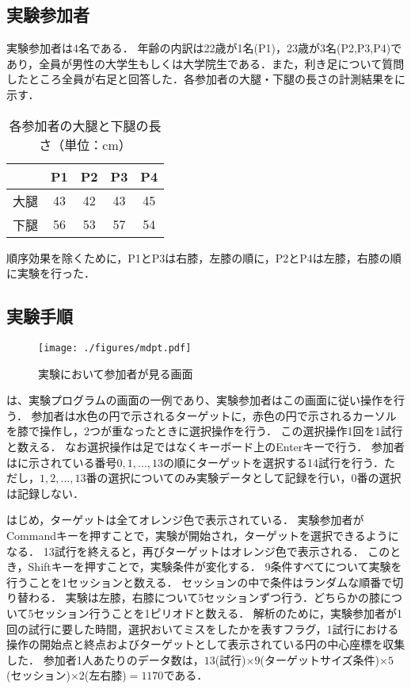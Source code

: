\documentclass[submit, techrep]{ipsj}
\begin{document}
\subsection{実験参加者}
実験参加者は4名である．
年齢の内訳は22歳が1名(P1)，23歳が3名(P2,P3,P4)であり，全員が男性の大学生もしくは大学院生である．また，利き足について質問したところ全員が右足と回答した．各参加者の大腿・下腿の長さの計測結果をに示す．
\begin{table}[tb]
	\begin{center}
	\caption{各参加者の大腿と下腿の長さ（単位：cm）}
		\begin{tabular}{|c|c|c|c|c|}
		\hline
			& P1 & P2 & P3 & P4 \\ \hline
		大腿 & 43 & 42 & 43 & 45 \\ \hline
		下腿 & 56 & 53 & 57 & 54 \\ \hline
		\end{tabular}
	\end{center}
	\label{tb:length}
\end{table}

順序効果を除くために，P1とP3は右膝，左膝の順に，P2とP4は左膝，右膝の順に実験を行った．
\subsection{実験手順}
\begin{figure}[tb]
	\begin{center}
		\texttt{[image: ./figures/mdpt.pdf]}
	\end{center}
	\caption{実験において参加者が見る画面}
	\label{img:mdpt}
\end{figure}
は、実験プログラムの画面の一例であり、実験参加者はこの画面に従い操作を行う．
参加者は水色の円で示されるターゲットに，赤色の円で示されるカーソルを膝で操作し，2つが重なったときに選択操作を行う．
この選択操作1回を1試行と数える．
なお選択操作は足ではなくキーボード上のEnterキーで行う．
参加者はに示されている番号$0,1,...,13$の順にターゲットを選択する14試行を行う．ただし，$1,2,...,13$番の選択についてのみ実験データとして記録を行い，$0$番の選択は記録しない．\par
はじめ，ターゲットは全てオレンジ色で表示されている．
実験参加者がCommandキーを押すことで，実験が開始され，ターゲットを選択できるようになる．
13試行を終えると，再びターゲットはオレンジ色で表示される．
このとき，Shiftキーを押すことで，実験条件が変化する．
9条件すべてについて実験を行うことを1セッションと数える．
セッションの中で条件はランダムな順番で切り替わる．
実験は左膝，右膝について5セッションずつ行う．どちらかの膝について5セッション行うことを1ピリオドと数える．
解析のために，実験参加者が1回の試行に要した時間，選択おいてミスをしたかを表すフラグ，1試行における操作の開始点と終点およびターゲットとして表示されている円の中心座標を収集した．
参加者1人あたりのデータ数は，$13$(試行)$\times 9$(ターゲットサイズ条件)$\times 5$(セッション)$\times 2$(左右膝)$ = 1170$である．
\end{document}
